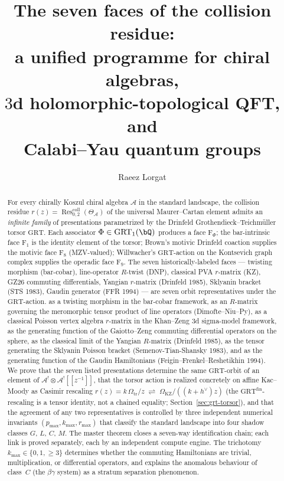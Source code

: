 \documentclass[11pt]{article}
\title{The seven faces of the collision residue:\\
a unified programme for chiral algebras,\\
$3$d holomorphic-topological QFT, and\\
Calabi--Yau quantum groups}
\author{Raeez Lorgat}
\date{}
\theoremstyle{plain}
\theoremstyle{definition}
\theoremstyle{remark}
\newcommand{\cA}{\mathcal{A}}
\newcommand{\Res}{\operatorname{Res}}
\begin{document}
\maketitle


\begin{abstract}
For every chirally Koszul chiral algebra $\cA$ in the standard
landscape, the collision residue
$r(z)=\Res^{\mathrm{coll}}_{0,2}(\Theta_{\cA})$ of the universal
Maurer--Cartan element admits an \emph{infinite family} of
presentations parametrized by the Drinfeld
Grothendieck--Teichmüller torsor $\mathrm{GRT}$. Each associator
$\Phi\in\mathrm{GRT}_1(\bQ)$ produces a face $\mathrm{F}_\Phi$; the
bar-intrinsic face $\mathrm{F}_1$ is the identity element of the
torsor; Brown's motivic Drinfeld coaction supplies the motivic face
$\mathrm{F}_8$ (MZV-valued); Willwacher's $\mathrm{GRT}$-action on
the Kontsevich graph complex supplies the operadic face
$\mathrm{F}_9$. The seven historically-labeled faces --- twisting
morphism (bar-cobar), line-operator $R$-twist (DNP), classical PVA
$r$-matrix (KZ), GZ26 commuting differentials, Yangian $r$-matrix
(Drinfeld 1985), Sklyanin bracket (STS 1983), Gaudin generator
(FFR 1994) --- are seven orbit representatives under the
$\mathrm{GRT}$-action. as a twisting morphism
in the bar-cobar framework, as an $R$-matrix governing the
meromorphic tensor product of line operators
\textup{(}Dimofte--Niu--Py\textup{)}, as a classical Poisson vertex
algebra $r$-matrix in the Khan--Zeng $3$d sigma-model framework, as
the generating function of the Gaiotto--Zeng commuting differential
operators on the sphere, as the classical limit of the Yangian
$R$-matrix \textup{(}Drinfeld 1985\textup{)}, as the tensor
generating the Sklyanin Poisson bracket
\textup{(}Semenov-Tian-Shansky 1983\textup{)}, and as the generating
function of the Gaudin Hamiltonians
\textup{(}Feigin--Frenkel--Reshetikhin 1994\textup{)}. We prove
that the seven listed presentations determine the same
$\mathrm{GRT}$-orbit of an element of
$\cA^{!}\otimes\cA^{!}[\![z^{-1}]\!]$, that the torsor action is
realized concretely on affine Kac--Moody as Casimir rescaling
$r(z) = k\,\Omega_{\mathrm{tr}}/z \;\rightleftharpoons\; \Omega_{\mathrm{KZ}}/((k+h^\vee)z)$
(the $\mathrm{GRT}^{\mathrm{fin}}$-rescaling is a tensor identity,
not a chained equality; Section~\ref{sec:grt-torsor}), and that the
agreement of any two representatives is controlled by three
independent numerical invariants
$(p_{\max},k_{\max},r_{\max})$ that classify the standard landscape
into four shadow classes $G$, $L$, $C$, $M$. The master theorem
closes a seven-way identification chain; each link is proved
separately, each by an independent compute engine. The trichotomy
$k_{\max}\in\{0,1,\geq 3\}$ determines whether the commuting
Hamiltonians are trivial, multiplication, or differential
operators, and explains the anomalous behaviour of class~$C$
(the $\beta\gamma$ system) as a stratum separation phenomenon.
\end{abstract}
\end{document}
